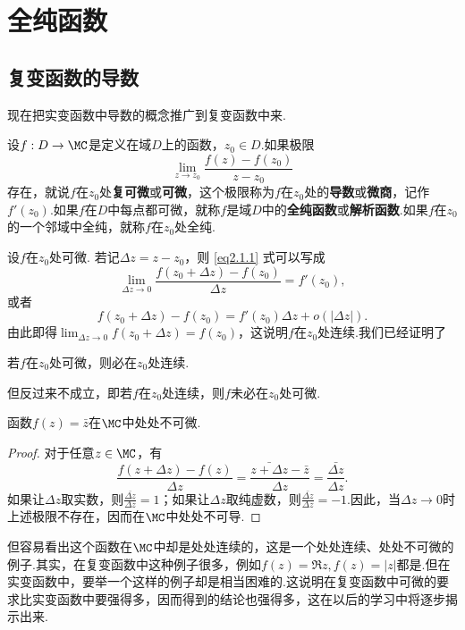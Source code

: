 \chapter{全纯函数\label{chap2}}
\section{复变函数的导数\label{sec2.1}}
现在把实变函数中导数的概念推广到复变函数中来.
\begin{definition}
设$f:D\to\MC$是定义在域$D$上的函数，$z_0\in D$.如果极限
\begin{equation}\label{eq2.1.1}
 \lim_{z\to z_0}\frac{f(z)-f(z_0)}{z-z_0}
\end{equation}
存在，就说$f$在$z_0$处\textbf{复可微}或\textbf{可微}，这个极限称为$f$在$z_0$处的\textbf{导数}或\textbf{微商}，记作$f'(z_0)$.如果$f$在$D$中每点都可微，就称$f$是域$D$中的\textbf{全纯函数}或\textbf{解析函数}.如果$f$在$z_0$的一个邻域中全纯，就称$f$在$z_0$处全纯.
\end{definition}

设$f$在$z_0$处可微. 若记$\Delta z=z-z_0$，则 \eqref{eq2.1.1} 式可以写成
\[\lim_{\Delta z\to0}\frac{f(z_0+\Delta z)-f(z_0)}{\Delta z}=f'(z_0),\]
或者
\begin{equation}\label{eq2.1.2}
f(z_0+\Delta z)-f(z_0)=f'(z_0)\Delta z+o(|\Delta z|).
\end{equation}
由此即得$\lim_{\Delta z\to0}f(z_0+\Delta z)=f(z_0)$，这说明$f$在$z_0$处连续.我们已经证明了
\begin{prop}\label{prop2.1.2}
  若$f$在$z_0$处可微，则必在$z_0$处连续.
\end{prop}

但反过来不成立，即若$f$在$z_0$处连续，则$f$未必在$z_0$处可微.

\begin{example}
函数$f(z)=\bar z$在$\MC$中处处不可微.
\end{example}
\begin{proof}
对于任意$z\in\MC$，有
 \[\frac{f(z+\Delta z)-f(z)}{\Delta z}=\frac{\bar{z+\Delta z}-\bar z}{\Delta z}=\frac{\bar{\Delta z}}{\Delta z}.\]
 如果让$\Delta z$取实数，则$\frac{\bar{\Delta z}}{\Delta z}=1$；如果让$\Delta z$取纯虚数，则$\frac{\bar{\Delta z}}{\Delta z}=-1$.因此，当$\Delta z\to0$时上述极限不存在，因而在$\MC$中处处不可导.
\end{proof}

但容易看出这个函数在$\MC$中却是处处连续的，这是一个处处连续、处处不可微的例子.其实，在复变函数中这种例子很多，例如$f(z)=\Re z,f(z)=|z|$都是.但在实变函数中，要举一个这样的例子却是相当困难的.这说明在复变函数中可微的要求比实变函数中要强得多，因而得到的结论也强得多，这在以后的学习中将逐步揭示出来.

